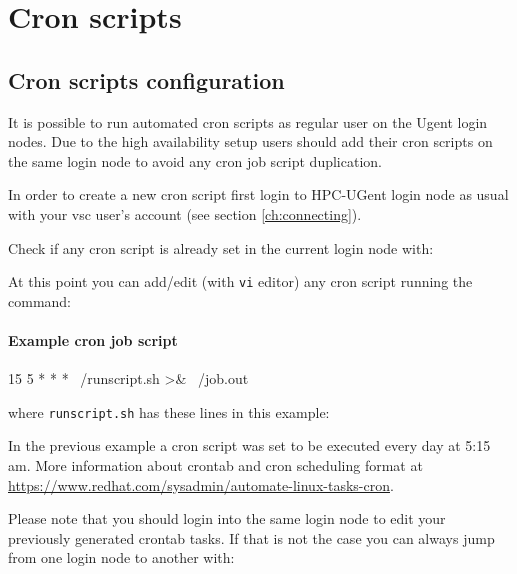 \chapter{Cron scripts}
\label{ch:crontab_ugent}


\section{Cron scripts configuration}
\label{sec:crontab_ugent_cron_scripts}
It is possible to run automated cron scripts as regular user on the Ugent login nodes.
Due to the high availability setup users should add their cron scripts on the same login
node to avoid any cron job script duplication.

In order to create a new cron script first login to HPC-UGent login node as
usual with your vsc user's account (see section \autoref{ch:connecting}).

Check if any cron script is already set in the current login node with:


\begin{prompt}
\end{prompt}

At this point you can add/edit (with \lstinline|vi| editor) any cron script running the command:

\begin{prompt}
\end{prompt}

\subsubsection{Example cron job script}
\label{sec:crontab_ugent_cron_script_example}
\begin{prompt}
 15 5 * * * ~/runscript.sh >& ~/job.out
\end{prompt}

where \lstinline|runscript.sh| has these lines in this example:


In the previous example a cron script was set to be executed every day at 5:15 am.
More information about crontab and cron scheduling format at 
\url{https://www.redhat.com/sysadmin/automate-linux-tasks-cron}.

Please note that you should login into the same login node to edit your previously 
generated crontab tasks. If that is not the case you can always jump from one login node
to another with:

\begin{prompt}
\end{prompt}




